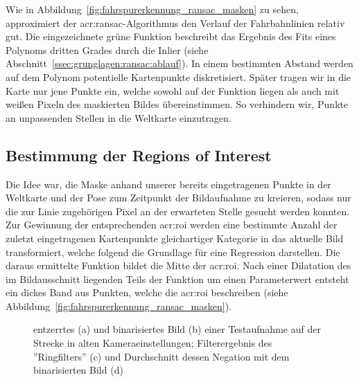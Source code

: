 Wie in Abbildung~\ref{fig:fahrspurerkennung_ransac_masken} zu sehen, approximiert der \gls{acr:ransac}-Algorithmus den Verlauf der Fahrbahnlinien relativ gut. Die eingezeichnete grüne Funktion beschreibt das Ergebnis des Fits eines Polynoms dritten Grades durch die Inlier (siehe Abschnitt~\ref{ssec:grunglagen:ransac:ablauf}). In einem bestimmten Abstand werden auf dem Polynom potentielle Kartenpunkte diskretisiert. Später tragen wir in die Karte nur jene Punkte ein, welche sowohl auf der Funktion liegen als auch mit weißen Pixeln des maskierten Bildes übereinstimmen. So verhindern wir, Punkte an unpassenden Stellen in die Weltkarte einzutragen. 


\subsection{Bestimmung der \glqq Regions of Interest\grqq{}}

Die Idee war, die Maske anhand unserer bereits eingetragenen Punkte in der Weltkarte und der Pose zum Zeitpunkt der Bildaufnahme zu kreieren, sodass nur die zur Linie zugehörigen Pixel an der erwarteten Stelle gesucht werden konnten. 
Zur Gewinnung der entsprechenden \gls{acr:roi} werden eine bestimmte Anzahl der zuletzt eingetragenen Kartenpunkte gleichartiger Kategorie in das aktuelle Bild transformiert, welche folgend die Grundlage für eine Regression darstellen. Die daraus ermittelte Funktion bildet die Mitte der \gls{acr:roi}. Nach einer Dilatation des im Bildausschnitt liegenden Teils der Funktion um einen Parameterwert entsteht ein dickes Band aus Punkten, welche die \gls{acr:roi} beschreiben (siehe Abbildung~\ref{fig:fahrspurerkennung_ransac_masken}).

\begin{figure}[htbp]
  \centering
  \hfill
  \hfill
  \hfill
  \caption{entzerrtes (a) und binarisiertes Bild (b) einer Testaufnahme auf der Strecke in alten Kameraeinstellungen; Filterergebnis des ''Ringfilters'' (c) und Durchschnitt dessen Negation mit dem binarisierten Bild (d)}
\label{fig:fahrspurerkennung_ransac_binarisieren}
\end{figure} 

